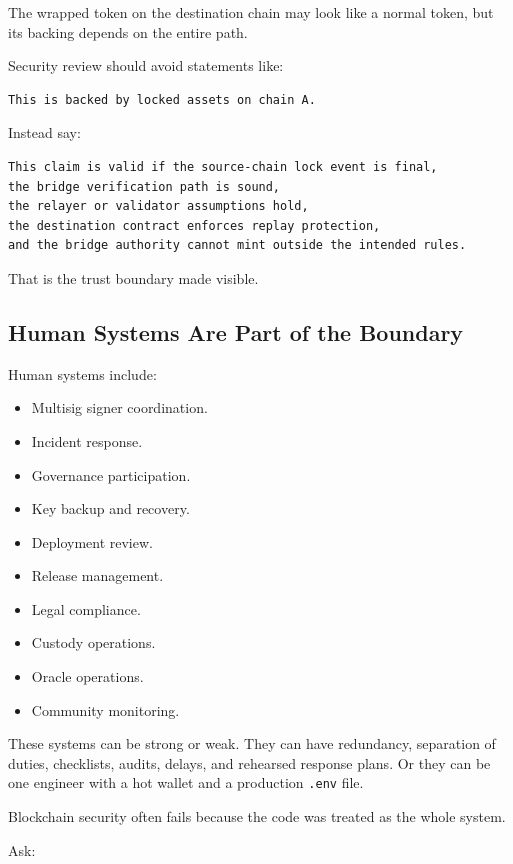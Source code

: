 The wrapped token on the destination chain may look like a normal token,
but its backing depends on the entire path.

Security review should avoid statements like:

\begin{lstlisting}
This is backed by locked assets on chain A.
\end{lstlisting}

Instead say:

\begin{lstlisting}
This claim is valid if the source-chain lock event is final,
the bridge verification path is sound,
the relayer or validator assumptions hold,
the destination contract enforces replay protection,
and the bridge authority cannot mint outside the intended rules.
\end{lstlisting}

That is the trust boundary made visible.

\subsection{Human Systems Are Part of the Boundary}

Human systems include:

\begin{itemize}
\tightlist
\item
  Multisig signer coordination.
\item
  Incident response.
\item
  Governance participation.
\item
  Key backup and recovery.
\item
  Deployment review.
\item
  Release management.
\item
  Legal compliance.
\item
  Custody operations.
\item
  Oracle operations.
\item
  Community monitoring.
\end{itemize}

These systems can be strong or weak. They can have redundancy,
separation of duties, checklists, audits, delays, and rehearsed response
plans. Or they can be one engineer with a hot wallet and a production
\passthrough{\lstinline!.env!} file.

Blockchain security often fails because the code was treated as the
whole system.

Ask:

